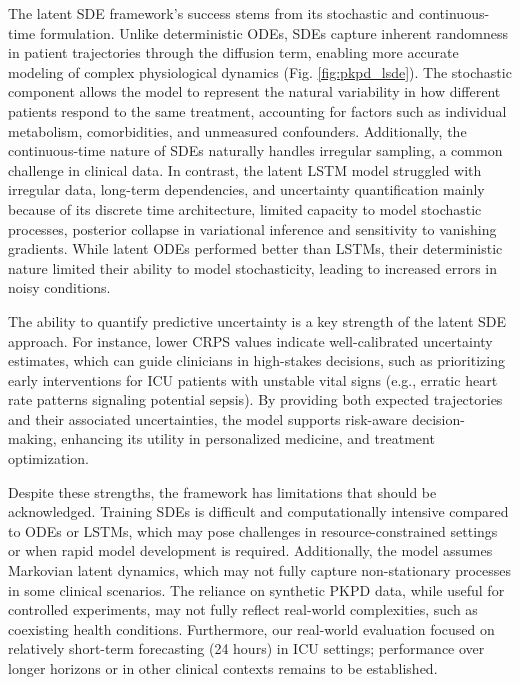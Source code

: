 \documentclass[preprint,12pt]{elsarticle}
\begin{document}
The latent SDE framework’s success stems from its stochastic and continuous-time formulation. Unlike deterministic ODEs, SDEs capture inherent randomness in patient trajectories through the diffusion term, enabling more accurate modeling of complex physiological dynamics (Fig. \ref{fig:pkpd_lsde}). The stochastic component allows the model to represent the natural variability in how different patients respond to the same treatment, accounting for factors such as individual metabolism, comorbidities, and unmeasured confounders. Additionally, the continuous-time nature of SDEs naturally handles irregular sampling, a common challenge in clinical data. In contrast, the latent LSTM model struggled with irregular data, long-term dependencies, and uncertainty quantification mainly because of its discrete time architecture, limited capacity to model stochastic processes, posterior collapse in variational inference and sensitivity to vanishing gradients. While latent ODEs performed better than LSTMs, their deterministic nature limited their ability to model stochasticity, leading to increased errors in noisy conditions.

The ability to quantify predictive uncertainty is a key strength of the latent SDE approach. For instance, lower CRPS values indicate well-calibrated uncertainty estimates, which can guide clinicians in high-stakes decisions, such as prioritizing early interventions for ICU patients with unstable vital signs (e.g., erratic heart rate patterns signaling potential sepsis). By providing both expected trajectories and their associated uncertainties, the model supports risk-aware decision-making, enhancing its utility in personalized medicine, and treatment optimization. 

Despite these strengths, the framework has limitations that should be acknowledged. Training SDEs is difficult and computationally intensive compared to ODEs or LSTMs, which may pose challenges in resource-constrained settings or when rapid model development is required. Additionally, the model assumes Markovian latent dynamics, which may not fully capture non-stationary processes in some clinical scenarios. The reliance on synthetic PKPD data, while useful for controlled experiments, may not fully reflect real-world complexities, such as coexisting health conditions. Furthermore, our real-world evaluation focused on relatively short-term forecasting (24 hours) in ICU settings; performance over longer horizons or in other clinical contexts remains to be established.
\end{document}
